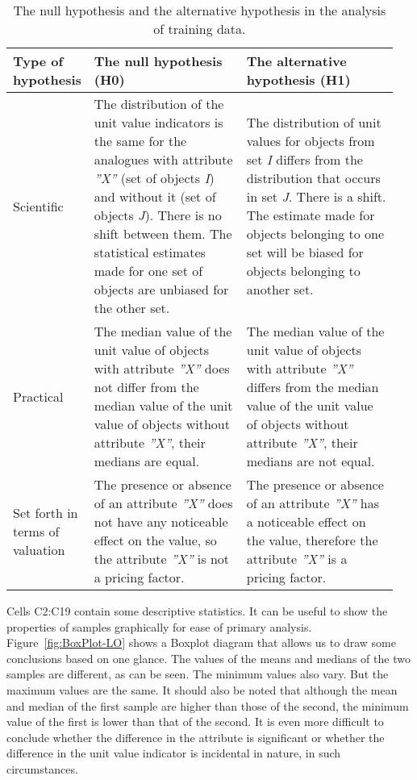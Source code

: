 \documentclass[]{scrreprt}
\begin{document}
\begin{table}[htp]
	\caption{The null hypothesis and the alternative hypothesis in the analysis of training data.}  \label{tab:nul-alt-hypothesis-variants}
	\centering
	\begin{tabularx}{\textwidth}{p{0.15\linewidth} p{0.4\linewidth} p{0.4\linewidth}} 
		\hline
		Type of hypothesis&The null hypothesis (H0)&The alternative hypothesis (H1)\\
		\hline
		Scientific&The distribution of the unit value indicators is the same for the analogues with attribute \textit{''X''} (set of objects \textit{I}) and without it (set of objects \textit{J}). There is no shift between them. The statistical estimates made for one set of objects are unbiased for the other set.&The distribution of unit values for objects from set \textit{I} differs from the distribution that occurs in set \textit{J}. There is a shift. The estimate made for objects belonging to one set will be biased for objects belonging to another set.\\
		\hline
		Practical&The median value of the unit value of objects with attribute \textit{''X''} does not differ from the median value of the unit value of objects without attribute \textit{''X''}, their medians are equal.&The median value of the unit value of objects with attribute \textit{''X''} differs from the median value of the unit value of objects without attribute \textit{''X''}, their medians are not equal.\\
		\hline
		Set forth in terms of valuation&The presence or absence of an attribute  \textit{''X''} does not have any noticeable effect on the value, so the attribute \textit{''X''} is not a pricing factor.&The presence or absence of an attribute \textit{''X''} has a noticeable effect on the value, therefore the attribute \textit{''X''} is a pricing factor.\\ \hline
	\end{tabularx}
\end{table}
%
Cells C2:C19 contain some descriptive statistics. It can be useful to show the properties of samples graphically for ease of primary analysis. Figure~\ref{fig:BoxPlot-LO} shows a Boxplot diagram that allows us to draw some conclusions based on one glance. The values of the means and medians of the two samples are different, as can be seen. The minimum values also vary. But the maximum values are the same. It should also be noted that although the mean and median of the first sample are higher than those of the second, the minimum value of the first is lower than that of the second. It is even more difficult to conclude whether the difference in the attribute is significant or whether the difference in the unit value indicator is incidental in nature, in such circumstances.
\end{document}
